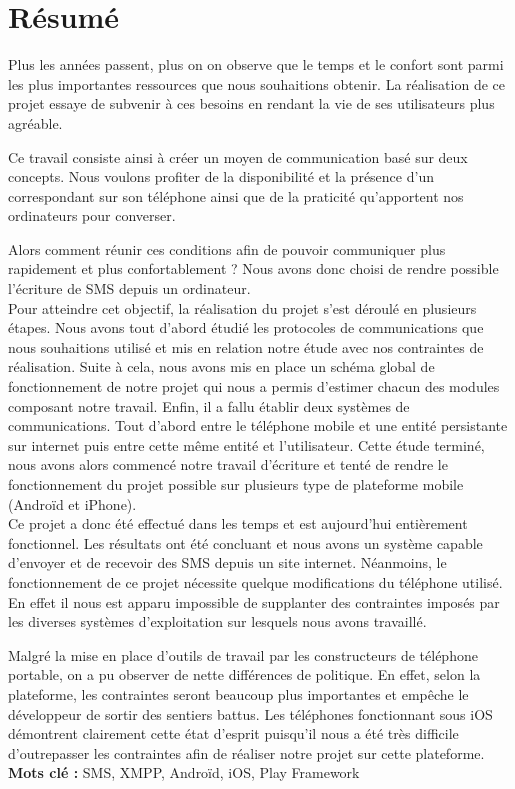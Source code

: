\cleardoublepage



\chapter*{Résumé}

\thispagestyle{empty}



Plus les années passent, plus on on observe que le temps et le confort sont parmi
les plus importantes ressources que nous souhaitions obtenir. La réalisation de ce
projet essaye de subvenir à ces besoins en rendant la vie de ses utilisateurs plus agréable.

Ce travail consiste ainsi à créer un moyen de communication basé sur deux concepts.
Nous voulons profiter de la disponibilité et la présence d'un correspondant sur son 
téléphone ainsi que de la praticité qu'apportent nos ordinateurs pour converser.

Alors comment réunir ces conditions afin de pouvoir communiquer plus rapidement et plus confortablement ?
Nous avons donc choisi de rendre possible l'écriture de SMS depuis un ordinateur.
\\


Pour atteindre cet objectif, la réalisation du projet s'est déroulé en plusieurs étapes.
Nous avons tout d'abord étudié les protocoles de communications que nous souhaitions utilisé
et mis en relation notre étude avec nos contraintes de réalisation. Suite à cela, nous avons
mis en place un schéma global de fonctionnement de notre projet qui nous a permis d'estimer
chacun des modules composant notre travail. Enfin, il a fallu établir deux systèmes de communications.
Tout d'abord entre le téléphone mobile et une entité persistante sur internet puis entre
cette même entité et l'utilisateur. Cette étude terminé, nous avons alors commencé notre
travail d'écriture et tenté de rendre le fonctionnement du projet possible sur plusieurs
type de plateforme mobile (Androïd et iPhone).
\\


Ce projet a donc été effectué dans les temps et est aujourd'hui entièrement fonctionnel.
Les résultats ont été concluant et nous avons un système capable d'envoyer et de recevoir
des SMS depuis un site internet. Néanmoins, le fonctionnement de ce projet nécessite quelque 
modifications du téléphone utilisé. En effet il nous est apparu impossible de supplanter
des contraintes imposés par les diverses systèmes d'exploitation sur lesquels nous avons travaillé.

Malgré la mise en place d'outils de travail par les constructeurs de téléphone portable,
on a pu observer de nette différences de politique. En effet, selon la plateforme, les contraintes
seront beaucoup plus importantes et empêche le développeur de sortir des sentiers battus. 
Les téléphones fonctionnant sous iOS démontrent clairement cette état d'esprit puisqu'il 
nous a été très difficile d'outrepasser les contraintes afin de réaliser notre projet sur cette plateforme.
\\



\textbf{Mots clé : } SMS, XMPP, Androïd, iOS, Play Framework
